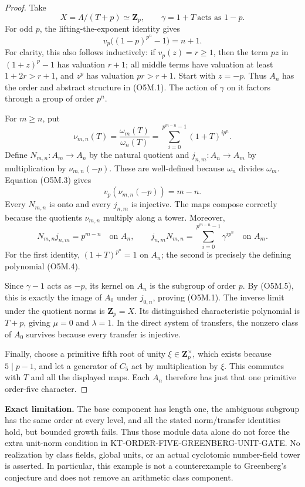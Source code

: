 \documentclass[11pt,a4paper]{article}
\theoremstyle{definition}
\renewcommand{\paragraph}[1]{\par\smallskip\noindent\textbf{#1}\quad\ignorespaces}
\begin{document}
\begin{proof}
Take
\[
             X=\Lambda/(T+p)\simeq\mathbf Z_p,
             \qquad \gamma=1+T\ \text{acts as }1-p.
                                                               \tag{O5M.2}
\]
For odd $p$, the lifting-the-exponent identity gives
\[
       v_p\bigl((1-p)^{p^n}-1\bigr)=n+1.               \tag{O5M.3}
\]
For clarity, this also follows inductively: if $v_p(z)=r\ge1$,
then the term $pz$ in $(1+z)^p-1$ has valuation $r+1$;
all middle terms have valuation at least $1+2r>r+1$, and
$z^p$ has valuation $pr>r+1$.  Start with $z=-p$.
Thus $A_n$ has the order and abstract structure in (O5M.1).
The action of $\gamma$ on it factors through a group of order $p^n$.

For $m\ge n$, put
\[
 \nu_{m,n}(T)=\frac{\omega_m(T)}{\omega_n(T)}
       =\sum_{i=0}^{p^{m-n}-1}(1+T)^{ip^n}.
                                                               \tag{O5M.4}
\]
Define $N_{m,n}:A_m\to A_n$ by the natural quotient and
$j_{n,m}:A_n\to A_m$ by multiplication by $\nu_{m,n}(-p)$.
These are well-defined because $\omega_n$ divides $\omega_m$.
Equation (O5M.3) gives
\[
              v_p(\nu_{m,n}(-p))=m-n.                 \tag{O5M.5}
\]
Every $N_{m,n}$ is onto and every $j_{n,m}$ is injective.
The maps compose correctly because the quotients $\nu_{m,n}$
multiply along a tower.  Moreover,
\[
 N_{m,n}j_{n,m}=p^{m-n}\quad\text{on }A_n,
 \qquad
 j_{n,m}N_{m,n}=\sum_{i=0}^{p^{m-n}-1}\gamma^{ip^n}
       \quad\text{on }A_m.                            \tag{O5M.6}
\]
For the first identity, $(1+T)^{p^n}=1$ on $A_n$;
the second is precisely the defining polynomial (O5M.4).

Since $\gamma-1$ acts as $-p$, its kernel on $A_n$ is the
subgroup of order $p$.  By (O5M.5), this is exactly the image
of $A_0$ under $j_{0,n}$, proving (O5M.1).
The inverse limit under the quotient norms is $\mathbf Z_p=X$.
Its distinguished characteristic polynomial is $T+p$, giving
$\mu=0$ and $\lambda=1$.  In the direct system of transfers,
the nonzero class of $A_0$ survives because every transfer is
injective.

Finally, choose a primitive fifth root of unity
$\xi\in\mathbf Z_p^{\times}$, which exists because $5\mid p-1$,
and let a generator of $C_5$ act by multiplication by $\xi$.
This commutes with $T$ and all the displayed maps.  Each $A_n$
therefore has just that one primitive order-five character.
\end{proof}

\paragraph{Exact limitation.}
The base component has length one, the ambiguous subgroup has the
same order at every level, and all the stated norm/transfer identities
hold, but bounded growth fails.  Thus those module data alone do not
force the extra unit-norm condition in
KT-ORDER-FIVE-GREENBERG-UNIT-GATE.
No realization by class fields, global units, or an actual
cyclotomic number-field tower is asserted.  In particular, this
example is not a counterexample to Greenberg's conjecture and does
not remove an arithmetic class component.
\end{document}
